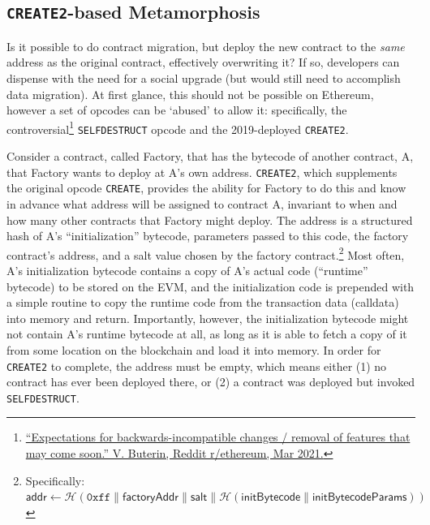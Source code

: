  

\subsection{\texttt{CREATE2}-based Metamorphosis}
\label{sec:metamorphic}

Is it possible to do contract migration, but deploy the new contract to the \textit{same} address as the original contract, effectively overwriting it? If so, developers can dispense with the need for a social upgrade (but would still need to accomplish data migration). At first glance, this should not be possible on Ethereum, however a set of opcodes can be `abused' to allow it: specifically, the controversial\footnote{\href{https://www.reddit.com/r/ethereum/comments/lx32kv/expectations\_for\_backwardsincompatible\_changes/}{``Expectations for backwards-incompatible changes / removal of features that may come soon.'' V. Buterin, Reddit r/ethereum, Mar 2021.}} \texttt{SELFDESTRUCT} opcode and the 2019-deployed \texttt{CREATE2}. 

Consider a contract, called Factory, that has the bytecode of another contract, A, that Factory wants to deploy at A's own address. \texttt{CREATE2}, which supplements the original opcode \texttt{CREATE}, provides the ability for Factory to do this and know in advance what address will be assigned to contract A, invariant to when and how many other contracts that Factory might deploy.  The address is a structured hash of A's ``initialization'' bytecode, parameters passed to this code, the factory contract's address, and a salt value chosen by the factory contract.\footnote{Specifically: $\mathsf{addr} \leftarrow \mathcal{H}(\mathtt{0xff} \| \mathsf{factoryAddr} \| \mathsf{salt} \| \mathcal{H} (\mathsf{initBytecode} \| \mathsf{initBytecodeParams}))$} Most often, A's initialization bytecode contains a copy of A's actual code (``runtime'' bytecode) to be stored on the EVM, and the initialization code is prepended with a simple routine to copy the runtime code from the transaction data (calldata) into memory and return. Importantly, however, the initialization bytecode might not contain A's runtime bytecode at all, as long as it is able to fetch a copy of it from some location on the blockchain and load it into memory. In order for \texttt{CREATE2} to complete, the address must be empty, which means either (1) no contract has ever been deployed there, or (2) a contract was deployed but invoked \texttt{SELFDESTRUCT}.

